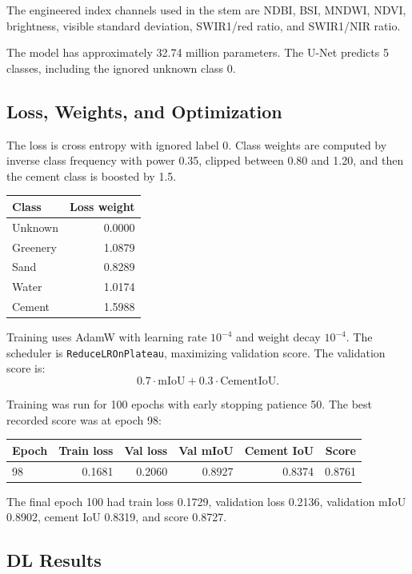 \documentclass[11pt,a4paper]{article}
\begin{document}
The engineered index channels used in the stem are NDBI, BSI, MNDWI, NDVI, brightness, visible standard deviation, SWIR1/red ratio, and SWIR1/NIR ratio.

The model has approximately 32.74 million parameters. The U-Net predicts 5 classes, including the ignored unknown class 0.

\subsection{Loss, Weights, and Optimization}

The loss is cross entropy with ignored label 0. Class weights are computed by inverse class frequency with power 0.35, clipped between 0.80 and 1.20, and then the cement class is boosted by 1.5.

\begin{center}
\begin{tabular}{lr}
\toprule
Class & Loss weight \\
\midrule
Unknown & 0.0000 \\
Greenery & 1.0879 \\
Sand & 0.8289 \\
Water & 1.0174 \\
Cement & 1.5988 \\
\bottomrule
\end{tabular}
\end{center}

Training uses AdamW with learning rate $10^{-4}$ and weight decay $10^{-4}$. The scheduler is \texttt{ReduceLROnPlateau}, maximizing validation score. The validation score is:
\[
0.7 \cdot \mathrm{mIoU} + 0.3 \cdot \mathrm{CementIoU}.
\]

Training was run for 100 epochs with early stopping patience 50. The best recorded score was at epoch 98:
\begin{center}
\begin{tabular}{lrrrrr}
\toprule
Epoch & Train loss & Val loss & Val mIoU & Cement IoU & Score \\
\midrule
98 & 0.1681 & 0.2060 & 0.8927 & 0.8374 & 0.8761 \\
\bottomrule
\end{tabular}
\end{center}

The final epoch 100 had train loss 0.1729, validation loss 0.2136, validation mIoU 0.8902, cement IoU 0.8319, and score 0.8727.

\subsection{DL Results}
\end{document}
